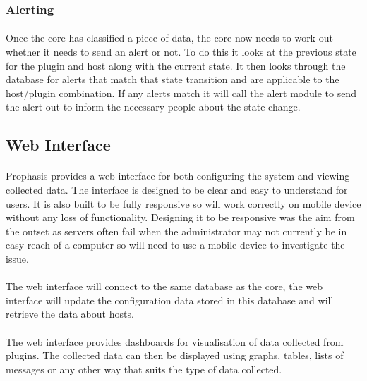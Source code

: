 \documentclass[bsc,logo,twoside]{infthesis}
\begin{document}
\subsubsection{Alerting}
\paragraph*{}
	Once the core has classified a piece of data, the core now needs to work out
	whether it needs to send an alert or not.  To do this it looks at the previous
	state for the plugin and host along with the current state.  It then looks through
	the database for alerts that match that state transition and are applicable to the
	host/plugin combination.  If any alerts match it will call the alert module to send
	the alert out to inform the necessary people about the state change.
	
\subsection{Web Interface}
\paragraph*{}
	Prophasis provides a web interface for both configuring the system and viewing
	collected data.  The interface is designed to be clear and easy to understand for
	users.  It is also built to be fully responsive so will work correctly on mobile
	device without any loss of functionality.  Designing it to be responsive was the
	aim from the outset as servers often fail when the administrator may not currently
	be in easy reach of a computer so will need to use a mobile device to investigate
	the issue.
	
\paragraph*{}
	The web interface will connect to the same database as the core, the web interface
	will update the configuration data stored in this database and will retrieve the
	data about hosts.
	
\paragraph*{}
	The web interface provides dashboards for visualisation of data collected from
	plugins.  The collected data can then be displayed using graphs, tables, lists
	of messages or any other way that suits the type of data collected.
\end{document}
